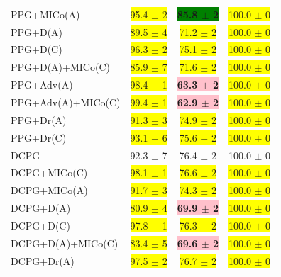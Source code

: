 \begin{table}[!h]
\begin{center}
\begin{tabular}{l|c|c|c}
PPG+MICo(A) & \colorbox{yellow}{95.4 $\pm$ 2 } & \textbf{\colorbox{green}{85.8 $\pm$ 2 }} & \colorbox{yellow}{100.0 $\pm$ 0 } \\ 
PPG+D(A) & \colorbox{yellow}{89.5 $\pm$ 4 } & \colorbox{yellow}{71.2 $\pm$ 2 } & \colorbox{yellow}{100.0 $\pm$ 0 } \\ 
PPG+D(C) & \colorbox{yellow}{96.3 $\pm$ 2 } & \colorbox{yellow}{75.1 $\pm$ 2 } & \colorbox{yellow}{100.0 $\pm$ 0 } \\ 
PPG+D(A)+MICo(C) & \colorbox{yellow}{85.9 $\pm$ 7 } & \colorbox{yellow}{71.6 $\pm$ 2 } & \colorbox{yellow}{100.0 $\pm$ 0 } \\ 
PPG+Adv(A) & \colorbox{yellow}{98.4 $\pm$ 1 } & \textbf{\colorbox{pink}{63.3 $\pm$ 2 }} & \colorbox{yellow}{100.0 $\pm$ 0 } \\ 
PPG+Adv(A)+MICo(C) & \colorbox{yellow}{99.4 $\pm$ 1 } & \textbf{\colorbox{pink}{62.9 $\pm$ 2 }} & \colorbox{yellow}{100.0 $\pm$ 0 } \\ 
PPG+Dr(A) & \colorbox{yellow}{91.3 $\pm$ 3 } & \colorbox{yellow}{74.9 $\pm$ 2 } & \colorbox{yellow}{100.0 $\pm$ 0 } \\ 
PPG+Dr(C) & \colorbox{yellow}{93.1 $\pm$ 6 } & \colorbox{yellow}{75.6 $\pm$ 2 } & \colorbox{yellow}{100.0 $\pm$ 0 } \\ \hline
DCPG & 92.3 $\pm$ 7 & 76.4 $\pm$ 2 & 100.0 $\pm$ 0 \\
DCPG+MICo(C) & \colorbox{yellow}{98.1 $\pm$ 1 } & \colorbox{yellow}{76.6 $\pm$ 2 } & \colorbox{yellow}{100.0 $\pm$ 0 } \\ 
DCPG+MICo(A) & \colorbox{yellow}{91.7 $\pm$ 3 } & \colorbox{yellow}{74.3 $\pm$ 2 } & \colorbox{yellow}{100.0 $\pm$ 0 } \\ 
DCPG+D(A) & \colorbox{yellow}{80.9 $\pm$ 4 } & \textbf{\colorbox{pink}{69.9 $\pm$ 2 }} & \colorbox{yellow}{100.0 $\pm$ 0 } \\ 
DCPG+D(C) & \colorbox{yellow}{97.8 $\pm$ 1 } & \colorbox{yellow}{76.3 $\pm$ 2 } & \colorbox{yellow}{100.0 $\pm$ 0 } \\ 
DCPG+D(A)+MICo(C) & \colorbox{yellow}{83.4 $\pm$ 5 } & \textbf{\colorbox{pink}{69.6 $\pm$ 2 }} & \colorbox{yellow}{100.0 $\pm$ 0 } \\ 
DCPG+Dr(A) & \colorbox{yellow}{97.5 $\pm$ 2 } & \colorbox{yellow}{76.7 $\pm$ 2 } & \colorbox{yellow}{100.0 $\pm$ 0 } \\ 
\end{tabular}
\end{center}
\end{table}

